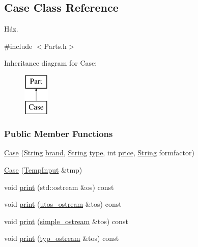 \subsection{Case Class Reference}
\label{class_case}


Ház.  




{\ttfamily \#include $<$Parts.\+h$>$}

Inheritance diagram for Case\+:\begin{figure}[H]
\begin{center}
\leavevmode
\includegraphics[height=2.000000cm]{class_case}
\end{center}
\end{figure}
\subsubsection*{Public Member Functions}
\begin{DoxyCompactItemize}
\item 
\mbox{\hyperlink{class_case_a0d953adffc664636549235d729f13260}{Case}} (\mbox{\hyperlink{class_string}{String}} \mbox{\hyperlink{class_part_ae06f2fdeb7fbbdb229a7aca151f3e341}{brand}}, \mbox{\hyperlink{class_string}{String}} \mbox{\hyperlink{class_part_a101dbcc5c4b21564df7414c7eb0eae88}{type}}, int \mbox{\hyperlink{class_part_a8e71223aed1da95a974f33d8d6c91bb1}{price}}, \mbox{\hyperlink{class_string}{String}} formfactor)
\item 
\mbox{\hyperlink{class_case_a035b7e07200ba4cf72c86a992d95b517}{Case}} (\mbox{\hyperlink{struct_temp_input}{Temp\+Input}} \&tmp)
\item 
void \mbox{\hyperlink{class_case_a9e54f42dcb7b62f1792a6475ce60aa79}{print}} (std\+::ostream \&os) const
\item 
void \mbox{\hyperlink{class_case_ae179519844b825815f4accddafae13b6}{print}} (\mbox{\hyperlink{structutos__ostream}{utos\+\_\+ostream}} \&tos) const
\item 
void \mbox{\hyperlink{class_case_a580b6870ea256cab7e7eee36820803e7}{print}} (\mbox{\hyperlink{structsimple__ostream}{simple\+\_\+ostream}} \&tos) const
\item 
void \mbox{\hyperlink{class_case_a6cce910485e45c0b30018fce491c154f}{print}} (\mbox{\hyperlink{structtyp__ostream}{typ\+\_\+ostream}} \&tos) const
\end{DoxyCompactItemize}
